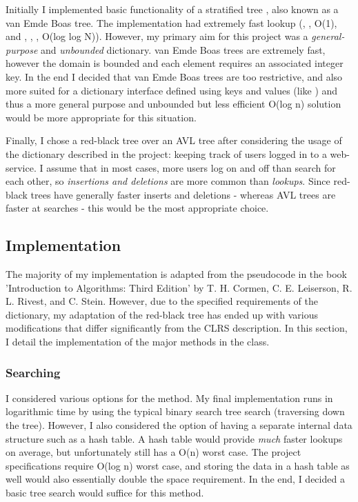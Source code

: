 Initially I implemented basic functionality of a stratified tree \parencite{stratified}, also known as a van Emde Boas tree. The implementation had extremely fast lookup (, ,  O(1), and , , ,  O(log log N)). However, my primary aim for this project was a \textit{general-purpose} and \textit{unbounded} dictionary. van Emde Boas trees are extremely fast, however the domain is bounded and each element requires an associated integer key. In the end I decided that van Emde Boas trees are too restrictive, and also more suited for a dictionary interface defined using keys and values (like ) and thus a more general purpose and unbounded but less efficient O(log n) solution would be more appropriate for this situation.

Finally, I chose a red-black tree over an AVL tree after considering the usage of the dictionary described in the project: keeping track of users logged in to a web-service. I assume that in most cases, more users log on and off than search for each other, so \textit{insertions and deletions} are more common than \textit{lookups}. Since red-black trees have generally faster inserts and deletions \parencite{clrs} - whereas AVL trees are faster at searches - this would be the most appropriate choice.

\subsection{Implementation}

The majority of my implementation is adapted from the pseudocode in the book 'Introduction to Algorithms: Third Edition' by T. H. Cormen, C. E. Leiserson, R. L. Rivest, and C. Stein. However, due to the specified requirements of the dictionary, my adaptation of the red-black tree has ended up with various modifications that differ significantly from the CLRS description. In this section, I detail the implementation of the major methods in the  class.

\subsubsection{Searching}
I considered various options for the  method. My final implementation runs in logarithmic time by using the typical binary search tree search (traversing down the tree). However, I also considered the option of having a separate internal data structure such as a hash table. A hash table would provide \textit{much} faster lookups on average, but unfortunately still has a O(n) worst case. The project specifications require O(log n) worst case, and storing the data in a hash table as well would also essentially double the space requirement. In the end, I decided a basic tree search would suffice for this method.
 
